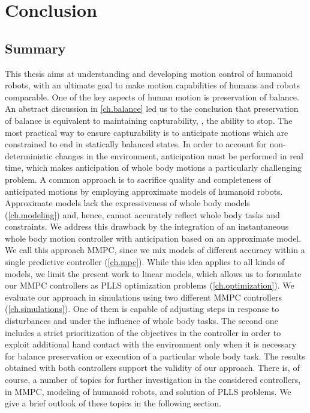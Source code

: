 \chapter{Conclusion}
\label{ch.conclusion}
\acresetall

\section{Summary}

This thesis aims at understanding and developing motion control of humanoid
robots, with an ultimate goal to make motion capabilities of humans and robots
comparable. One of the key aspects of human motion is preservation of balance.
An abstract discussion in \cref{ch.balance} led us to the conclusion that
preservation of balance is equivalent to maintaining capturability, \IE, the
ability to stop. The most practical way to ensure capturability is to
anticipate motions which are constrained to end in statically balanced states.
In order to account for non-deterministic changes in the environment,
anticipation must be performed in real time, which makes anticipation of whole
body motions a particularly challenging problem. A common approach is to
sacrifice quality and completeness of anticipated motions by employing
approximate models of humanoid robots. Approximate models lack the
expressiveness of whole body models (\cref{ch.modeling}) and, hence, cannot
accurately reflect whole body tasks and constraints. We address this drawback
by the integration of an instantaneous whole body motion controller with
anticipation based on an approximate model. We call this approach \ac{MMPC},
since we mix models of different accuracy within a single predictive controller
(\cref{ch.mpc}). While this idea applies to all kinds of models, we limit the
present work to linear models, which allows us to formulate our \ac{MMPC}
controllers as \ac{PLLS} optimization problems (\cref{ch.optimization}). We
evaluate our approach in simulations using two different \ac{MMPC} controllers
(\cref{ch.simulations}). One of them is capable of adjusting steps in response
to disturbances and under the influence of whole body tasks. The second one
includes a strict prioritization of the objectives in the controller in order
to exploit additional hand contact with the environment only when it is
necessary for balance preservation or execution of a particular whole body
task. The results obtained with both controllers support the validity of our
approach. There is, of course, a number of topics for further investigation in
the considered controllers, in \ac{MMPC}, modeling of humanoid robots, and
solution of \ac{PLLS} problems. We give a brief outlook of these topics in the
following section.



